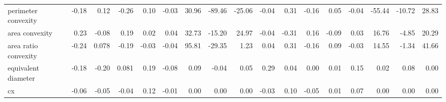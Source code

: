 \documentclass{article}
\begin{document}
\begin{table}[!ht]
{\begin{tabular}{lrrrrrrrrrrrrrrrr}
perimeter convexity                                                     & -0.18                    & 0.12                     & -0.26                    & 0.10                     & -0.03                    & 30.96                    & -89.46                   & -25.06                   & -0.04                    & 0.31                     & -0.16                    & 0.05                     & -0.04                    & -55.44                   & -10.72                   & 28.83                    \\
area convexity                                                          & 0.23                     & -0.08                    & 0.19                     & 0.02                     & 0.04                     & 32.73                    & -15.20                   & 24.97                    & -0.04                    & -0.31                    & 0.16                     & -0.09                    & 0.03                     & 16.76                    & -4.85                    & 20.29                    \\
area ratio convexity                                                    & -0.24                    & 0.078                    & -0.19                    & -0.03                    & -0.04                    & 95.81                    & -29.35                   & 1.23                     & 0.04                     & 0.31                     & -0.16                    & 0.09                     & -0.03                    & 14.55                    & -1.34                    & 41.66                    \\
equivalent diameter                                                     & -0.18                    & -0.20                    & 0.081                    & 0.19                     & -0.08                    & 0.09                     & -0.04                    & 0.05                     & 0.29                     & 0.04                     & 0.00                     & 0.01                     & 0.15                     & 0.02                     & 0.08                     & 0.00                     \\
cx                                                                      & -0.06                    & -0.05                    & -0.04                    & 0.12                     & -0.01                    & 0.00                     & 0.00                     & 0.00                     & -0.03                    & 0.10                     & -0.05                    & 0.01                     & 0.07                     & 0.00                     & 0.00                     & 0.00                     \\

\end{tabular}}
\end{table}
\end{document}
